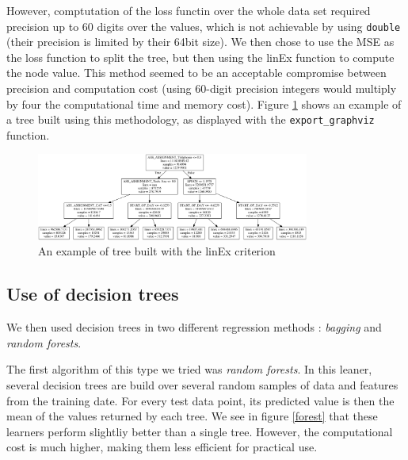 \documentclass[a4paper,10pt]{article}
\begin{document}
  However, comptutation of the loss functin over the whole data set required precision up to 60 digits over the values, which is not achievable by using {\tt double} (their precision is limited by their 64bit size). We then chose to use the MSE as the loss function to split the tree, but then using the linEx function to compute the node value. This method seemed to be an acceptable compromise between precision and computation cost (using 60-digit precision integers would multiply by four the computational time and memory cost). Figure \ref{tree_example} shows an example of a tree built using this methodology, as displayed with the {\tt export\_graphviz} function.
  \begin{figure}
    \label{tree_example}
    \centering
    \includegraphics[width=0.8\textwidth]{graphics/tree.png}
    \caption{An example of tree built with the linEx criterion}
  \end{figure}

  \subsection{Use of decision trees}

  We then used decision trees in two different regression methods : \emph{bagging} and \emph{random forests}.

  The first algorithm of this type we tried was \emph{random forests}. In this leaner, several decision trees are build over several random samples of data and features from the training date. For every test data point, its predicted value is then the mean of the values returned by each tree. We see in figure \ref{forest} that these learners perform slightliy better than a single tree. However, the computational cost is much higher, making them less efficient for practical use.
\end{document}
